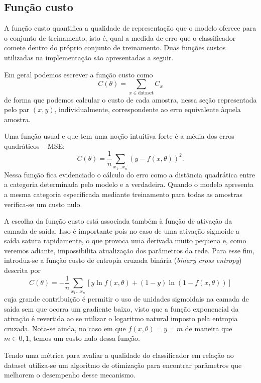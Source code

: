 \subsection{Função custo}
A função custo quantifica a qualidade de representação que o modelo oferece para o conjunto de treinamento, isto é, qual a medida de erro que o classificador comete dentro do próprio conjunto de treinamento. Duas funções custos utilizadas na implementação são apresentadas a seguir.

Em geral podemos escrever a função custo como
\begin{equation}
C(\theta) = \sum_{x \in \text{dataset}} C_x
\end{equation}
de forma que podemos calcular o custo de cada amostra, nessa seção representada pelo par $(x,y)$, individualmente, correspondente ao erro equivalente àquela amostra.

Uma função usual e que tem uma noção intuitiva forte é a média dos erros quadráticos -- MSE:
\begin{equation}
\label{eq:mse}
C(\theta) = \frac{1}{n} \sum_{x_1 \ldots x_n} \left(y - f(x,\theta)\right)^2.
\end{equation}
Nessa função fica evidenciado o cálculo do erro como a distância quadrática entre a categoria determinada pelo modelo e a verdadeira. Quando o modelo apresenta a mesma categoria especificada mediante treinamento para todas as amostras verifica-se um custo nulo.

A escolha da função custo está associada também à função de ativação da camada de saída. Isso é importante pois no caso de uma ativação sigmoide a saída satura rapidamente, o que provoca uma derivada muito pequena e, como veremos adiante, impossibilita atualização dos parâmetros da rede. Para esse fim, introduz-se a função custo de entropia cruzada binária (\textit{binary cross entropy}) descrita por
\begin{equation}
\label{eq:bcr}
C(\theta) = -\frac{1}{n} \sum_{x_1 \ldots x_n} \left[y \ln f(x,\theta) + (1-y) \ln (1-f(x,\theta))\right]
\end{equation}
cuja grande contribuição é permitir o uso de unidades sigmoidais na camada de saída sem que ocorra um gradiente baixo, visto que a função exponencial da ativação é revertida ao se utilizar o logaritmo natural imposto pela entropia cruzada. Nota-se ainda, no caso em que $f(x,\theta)=y=m$ de maneira que $m \in {0,1}$, temos um custo nulo dessa função.

Tendo uma métrica para avaliar a qualidade do classificador em relação ao dataset utiliza-se um algoritmo de otimização para encontrar parâmetros que melhorem o desempenho desse mecanismo.

